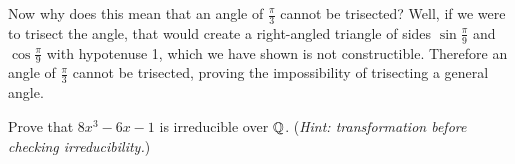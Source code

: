 Now why does this mean that an angle of $\frac\pi3$ cannot be trisected? Well, if we were to trisect the angle, that would create a right-angled triangle of sides $\sin\frac\pi9$ and $\cos\frac\pi9$ with hypotenuse 1, which we have shown is not constructible. Therefore an angle of $\frac\pi3$ cannot be trisected, proving the impossibility of trisecting a general angle.

\begin{exercise}\label{exercise-triple-angle-cosine-polynomial-is-irreducible}
    Prove that $8x^3 - 6x - 1$ is irreducible over $\mathbb{Q}$.\newline
    (\textit{Hint: transformation before checking irreducibility.})
\end{exercise}
